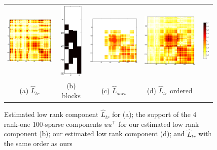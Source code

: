 \begin{figure}
\label{fig:gen}
\center
\begin{tabular}{ccccc}
      \includegraphics[width=4cm]{fig/MILE_Lsl_not_ordered}
  &   \includegraphics[height=3.8cm]{fig/MILE_blocks}
  &   \includegraphics[width=4cm]{fig/MILE_Lom} 
  &   \includegraphics[width=4cm]{fig/MILE_Lsl_ordered} 
  &   \includegraphics[height=3.8cm]{fig/colorbar} 
   \\   (a)  $\hat{L}_{tr}$  & (b) blocks &(c) $\hat{L}_{ours}$ &(d) $\hat{L}_{tr}$ ordered  
\end{tabular}
\caption{Estimated low rank component $\hat{L}_{tr}$ for \citet{chandrasekaran2010} (a);  the support of the 4 rank-one 100-sparse components $uu^{\top}$ for our estimated low rank component  (b);  our estimated low rank component (d); and $\hat{L}_{tr}$  with the same order as ours }
\end{figure}
